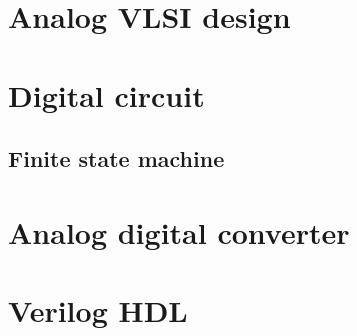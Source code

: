 \documentclass[UTF8]{book}
\begin{document}
	\part{Analog VLSI design}
	\label{Analog VLSI design}
	
	
	\begin{comment} 
	rather stupid, but helpful 
	\chapter{Current source}
	\label{Current source}
	\chapter{Current mirror}
	\label{Current mirror }
	\chapter{Differential amplifier pair}
	\label{Differential amplifier pair}
	\chapter{OP AMP design}
	\label{OP AMP design}
	\end{comment}

	
	
	\part{Digital circuit}
	\label{Digital circuit}
	
	\begin{comment} 
	rather stupid, but helpful 
	\end{comment}
	
	\chapter{Finite state machine}
	\label{Finite state machine}
	
	\part{Analog digital converter}
	\label{Analog digital converter}
	
	\part{Verilog HDL}
	\label{Verilog HDL}
	
\end{document}
